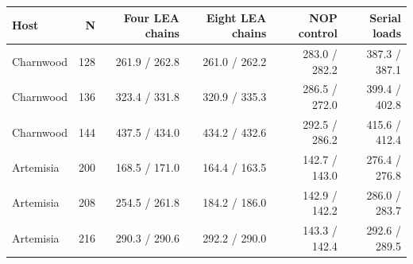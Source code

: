 \begin{tabular}{lrrrrr}
\toprule
Host & N & Four LEA chains & Eight LEA chains & NOP control & Serial loads \\
\midrule
Charnwood & 128 & 261.9 / 262.8 & 261.0 / 262.2 & 283.0 / 282.2 & 387.3 / 387.1 \\
Charnwood & 136 & 323.4 / 331.8 & 320.9 / 335.3 & 286.5 / 272.0 & 399.4 / 402.8 \\
Charnwood & 144 & 437.5 / 434.0 & 434.2 / 432.6 & 292.5 / 286.2 & 415.6 / 412.4 \\
Artemisia & 200 & 168.5 / 171.0 & 164.4 / 163.5 & 142.7 / 143.0 & 276.4 / 276.8 \\
Artemisia & 208 & 254.5 / 261.8 & 184.2 / 186.0 & 142.9 / 142.2 & 286.0 / 283.7 \\
Artemisia & 216 & 290.3 / 290.6 & 292.2 / 290.0 & 143.3 / 142.4 & 292.6 / 289.5 \\
\bottomrule
\end{tabular}
